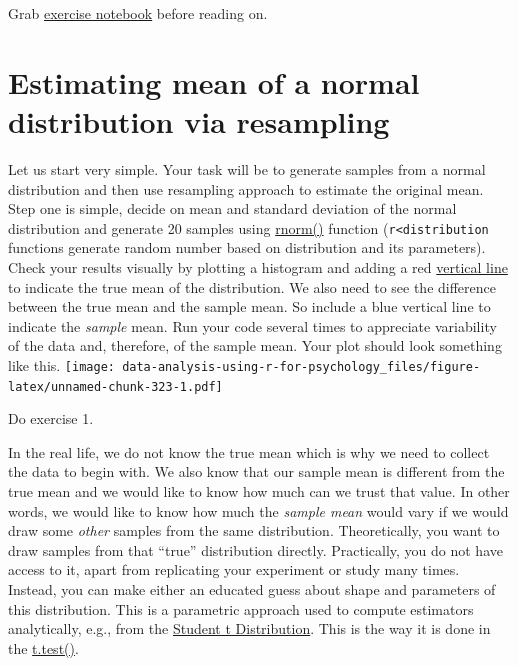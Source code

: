 \documentclass[
]{book}
\begin{document}
Grab \href{notebooks/Seminar\%2013\%20-\%20resampling.Rmd}{exercise notebook} before reading on.

\hypertarget{estimating-mean-of-a-normal-distribution-via-resampling}{%
\section{Estimating mean of a normal distribution via resampling}\label{estimating-mean-of-a-normal-distribution-via-resampling}}

Let us start very simple. Your task will be to generate samples from a normal distribution and then use resampling approach to estimate the original mean. Step one is simple, decide on mean and standard deviation of the normal distribution and generate 20 samples using \href{https://stat.ethz.ch/R-manual/R-devel/library/stats/html/Normal.html}{rnorm()} function (\texttt{r\textless{}distribution} functions generate random number based on distribution and its parameters). Check your results visually by plotting a histogram and adding a red \href{https://ggplot2.tidyverse.org/reference/geom_abline.html}{vertical line} to indicate the true mean of the distribution. We also need to see the difference between the true mean and the sample mean. So include a blue vertical line to indicate the \emph{sample} mean. Run your code several times to appreciate variability of the data and, therefore, of the sample mean.
Your plot should look something like this.
\texttt{[image: data-analysis-using-r-for-psychology\_files/figure-latex/unnamed-chunk-323-1.pdf]}

Do exercise 1.

In the real life, we do not know the true mean which is why we need to collect the data to begin with. We also know that our sample mean is different from the true mean and we would like to know how much can we trust that value. In other words, we would like to know how much the \emph{sample mean} would vary if we would draw some \emph{other} samples from the same distribution. Theoretically, you want to draw samples from that ``true'' distribution directly. Practically, you do not have access to it, apart from replicating your experiment or study many times. Instead, you can make either an educated guess about shape and parameters of this distribution. This is a parametric approach used to compute estimators analytically, e.g., from the \href{https://stat.ethz.ch/R-manual/R-devel/library/stats/html/TDist.html}{Student t Distribution}. This is the way it is done in the \href{https://stat.ethz.ch/R-manual/R-devel/library/stats/html/t.test.html}{t.test()}.
\end{document}
